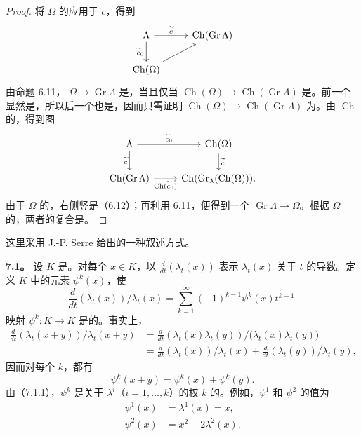 \begin{proof}
将 $\Omega$ 的应用于 $\widetilde c$，得到
\[
\begin{tikzcd}
\Lambda \arrow[r,"\widetilde c"] \arrow[d,"\widetilde c_0"'] &
 \operatorname{Ch}(\operatorname{Gr}\Lambda)\\
\operatorname{Ch}(\Omega) \arrow[ur] &
\end{tikzcd}
\]
由命题 6.11，
$\Omega\longrightarrow\operatorname{Gr}\Lambda$ 是，当且仅当
$\operatorname{Ch}(\Omega)\longrightarrow\operatorname{Ch}(\operatorname{Gr}\Lambda)$ 是。前一个显然是，所以后一个也是，因而只需证明
$\operatorname{Ch}(\Omega)\longrightarrow\operatorname{Ch}(\operatorname{Gr}\Lambda)$ 为。由 $\operatorname{Ch}$ 的，得到图
\[
\begin{tikzcd}
\Lambda \arrow[r,"\widetilde c_0"] \arrow[d,"\widetilde c"'] &
 \operatorname{Ch}(\Omega) \arrow[d,"\widetilde c"]\\
\operatorname{Ch}(\operatorname{Gr}\Lambda)
 \arrow[r,"\operatorname{Ch}(\widetilde c_0)"'] &
 \operatorname{Ch}(\operatorname{Gr}_{\lambda}(\operatorname{Ch}(\Omega))).
\end{tikzcd}
\]
由于 $\Omega$ 的，右侧竖是（6.12）；再利用 6.11，便得到一个
$\operatorname{Gr}\Lambda\longrightarrow\Omega$。根据 $\Omega$ 的，两者的复合是。
\end{proof}

这里采用 J.-P. Serre 给出的一种叙述方式。

\textbf{7.1。} 设 $K$ 是。对每个 $x\in K$，以
$\frac{d}{dt}(\lambda_t(x))$ 表示 $\lambda_t(x)$ 关于 $t$ 的导数。定义 $K$ 中的元素 $\psi^k(x)$，使
\[
\frac{d}{dt}(\lambda_t(x))/\lambda_t(x)
 =\sum_{k=1}^{\infty}(-1)^{k-1}\psi^k(x)t^{k-1}.
\tag{7.1.1}
\]
映射 $\psi^k:K\longrightarrow K$ 是的。事实上，
\[
\begin{aligned}
\frac{d}{dt}(\lambda_t(x+y))/\lambda_t(x+y)
 &=\frac{d}{dt}(\lambda_t(x)\lambda_t(y))
   /\bigl(\lambda_t(x)\lambda_t(y)\bigr)\\
 &=\frac{d}{dt}(\lambda_t(x))/\lambda_t(x)
  +\frac{d}{dt}(\lambda_t(y))/\lambda_t(y),
\end{aligned}
\]
因而对每个 $k$，都有
\[
\psi^k(x+y)=\psi^k(x)+\psi^k(y).
\]
由（7.1.1），$\psi^k$ 是关于 $\lambda^i$（$i=1,\ldots,k$）的权 $k$ 的。例如，$\psi^1$ 和 $\psi^2$ 的值为
\[
\begin{aligned}
\psi^1(x)&=\lambda^1(x)=x,\\
\psi^2(x)&=x^2-2\lambda^2(x).
\end{aligned}
\]

